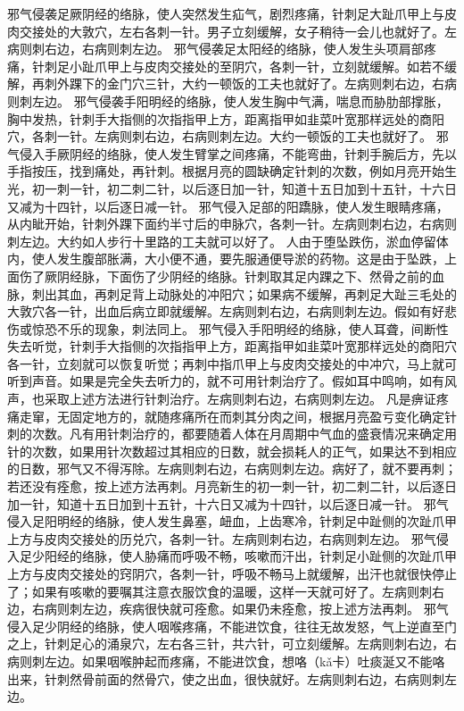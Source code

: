 \documentclass[a4paper,12pt,UTF8,twoside]{ctexbook}
\begin{document}
邪气侵袭足厥阴经的络脉，使人突然发生疝气，剧烈疼痛，针刺足大趾爪甲上与皮肉交接处的大敦穴，左右各刺一针。男子立刻缓解，女子稍待一会儿也就好了。左病则刺右边，右病则刺左边。
邪气侵袭足太阳经的络脉，使人发生头项肩部疼痛，针刺足小趾爪甲上与皮肉交接处的至阴穴，各刺一针，立刻就缓解。如若不缓解，再刺外踝下的金门穴三针，大约一顿饭的工夫也就好了。左病则刺右边，右病则刺左边。
邪气侵袭手阳明经的络脉，使人发生胸中气满，喘息而胁肋部撑胀，胸中发热，针刺手大指侧的次指指甲上方，距离指甲如韭菜叶宽那样远处的商阳穴，各刺一针。左病则刺右边，右病则刺左边。大约一顿饭的工夫也就好了。
邪气侵入手厥阴经的络脉，使人发生臂掌之间疼痛，不能弯曲，针刺手腕后方，先以手指按压，找到痛处，再针刺。根据月亮的圆缺确定针刺的次数，例如月亮开始生光，初一刺一针，初二刺二针，以后逐日加一针，知道十五日加到十五针，十六日又减为十四针，以后逐日减一针。
邪气侵入足部的阳蹻脉，使人发生眼睛疼痛，从内眦开始，针刺外踝下面约半寸后的申脉穴，各刺一针。左病则刺右边，右病则刺左边。大约如人步行十里路的工夫就可以好了。
人由于堕坠跌伤，淤血停留体内，使人发生腹部胀满，大小便不通，要先服通便导淤的药物。这是由于坠跌，上面伤了厥阴经脉，下面伤了少阴经的络脉。针刺取其足内踝之下、然骨之前的血脉，刺出其血，再刺足背上动脉处的冲阳穴；如果病不缓解，再刺足大趾三毛处的大敦穴各一针，出血后病立即就缓解。左病则刺右边，右病则刺左边。假如有好悲伤或惊恐不乐的现象，刺法同上。
邪气侵入手阳明经的络脉，使人耳聋，间断性失去听觉，针刺手大指侧的次指指甲上方，距离指甲如韭菜叶宽那样远处的商阳穴各一针，立刻就可以恢复听觉；再刺中指爪甲上与皮肉交接处的中冲穴，马上就可听到声音。如果是完全失去听力的，就不可用针刺治疗了。假如耳中鸣响，如有风声，也采取上述方法进行针刺治疗。左病则刺右边，右病则刺左边。
凡是痹证疼痛走窜，无固定地方的，就随疼痛所在而刺其分肉之间，根据月亮盈亏变化确定针刺的次数。凡有用针刺治疗的，都要随着人体在月周期中气血的盛衰情况来确定用针的次数，如果用针次数超过其相应的日数，就会损耗人的正气，如果达不到相应的日数，邪气又不得泻除。左病则刺右边，右病则刺左边。病好了，就不要再刺；若还没有痊愈，按上述方法再刺。月亮新生的初一刺一针，初二刺二针，以后逐日加一针，知道十五日加到十五针，十六日又减为十四针，以后逐日减一针。
邪气侵入足阳明经的络脉，使人发生鼻塞，衄血，上齿寒冷，针刺足中趾侧的次趾爪甲上方与皮肉交接处的历兑穴，各刺一针。左病则刺右边，右病则刺左边。
邪气侵入足少阳经的络脉，使人胁痛而呼吸不畅，咳嗽而汗出，针刺足小趾侧的次趾爪甲上方与皮肉交接处的窍阴穴，各刺一针，呼吸不畅马上就缓解，出汗也就很快停止了；如果有咳嗽的要嘱其注意衣服饮食的温暖，这样一天就可好了。左病则刺右边，右病则刺左边，疾病很快就可痊愈。如果仍未痊愈，按上述方法再刺。
邪气侵入足少阴经的络脉，使人咽喉疼痛，不能进饮食，往往无故发怒，气上逆直至门之上，针刺足心的涌泉穴，左右各三针，共六针，可立刻缓解。左病则刺右边，右病则刺左边。如果咽喉肿起而疼痛，不能进饮食，想咯（kǎ卡）吐痰涎又不能咯出来，针刺然骨前面的然骨穴，使之出血，很快就好。左病则刺右边，右病则刺左边。
\end{document}

